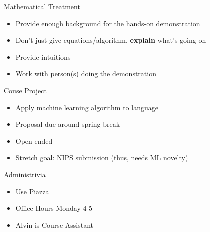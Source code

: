 \documentclass[compress]{beamer}
\begin{document}
\begin{frame}{Mathematical Treatment}

  \begin{itemize}
    \item Provide enough background for the hands-on demonstration
    \item Don't just give equations/algorithm, {\bf explain} what's
      going on
    \item Provide intuitions
    \item Work with person(s) doing the demonstration
  \end{itemize}

\end{frame}


\begin{frame}{Couse Project}

\begin{itemize}
  \item Apply machine learning algorithm to language
  \item Proposal due around spring break
  \item Open-ended
  \item Stretch goal: NIPS submission (thus, needs ML novelty)
\end{itemize}

\end{frame}


\begin{frame}{Administrivia}

  \begin{itemize}
    \item Use Piazza
    \item Office Hours Monday 4-5
    \item Alvin is Course Assistant
\end{itemize}

\end{frame}
\end{document}
